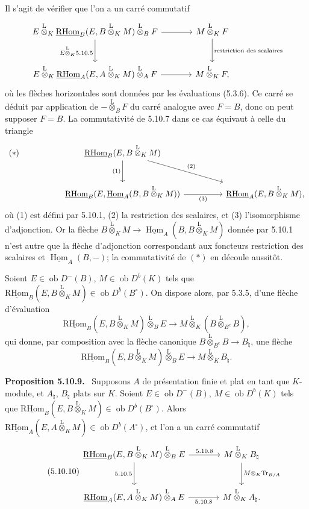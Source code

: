\documentclass[11pt]{article}
\newenvironment{statement}[1]{\par\medskip\noindent\textbf{#1.}\ }{\par\medskip}
\DeclareMathOperator{\Hom}{Hom}
\newcommand{\R}{\mathrm{R}}\newcommand{\RHomCore}{\mathrm{RHom}}
\newcommand{\ob}{\operatorname{ob}}
\providecommand{\RHom}{\RHomCore}
\providecommand{\uRHom}{\underline{\RHom}}
\providecommand{\uHom}{\underline{\Hom}}
\providecommand{\Tr}{\operatorname{Tr}}
\providecommand{\Tr}{\operatorname{Tr}}
\providecommand{\lten}{\overset{\mathrm L}{\otimes}}
\providecommand{\Tr}{\operatorname{Tr}}
\providecommand{\RHom}{\RHomCore}
\providecommand{\Hom}{\operatorname{Hom}}
\providecommand{\ob}{\operatorname{ob}}
\providecommand{\lten}{\overset{\mathrm L}{\otimes}}
\providecommand{\RHom}{\R\mathcal{H}om}
\providecommand{\lten}{\overset{\mathrm L}{\otimes}}
\providecommand{\R}{\mathrm R}
\providecommand{\Tr}{\operatorname{Tr}}
\providecommand{\lten}{\overset{\mathrm L}{\otimes}}
\providecommand{\lten}{\overset{\mathrm L}{\otimes}}
\providecommand{\lten}{\overset{\mathrm L}{\otimes}}
\providecommand{\RHom}{\RHomCore}
\providecommand{\Hom}{\operatorname{Hom}}
\providecommand{\Tr}{\operatorname{Tr}}
\providecommand{\lten}{\overset{\mathrm L}{\otimes}}
\begin{document}
Il s'agit de vérifier que l'on a un carré commutatif
\[
\begin{tikzcd}[column sep=large,row sep=large]
E\lten_K\uRHom_B(E,B\lten_KM)\lten_BF \arrow[r] \arrow[d,"E\lten_K5.10.5"'] & M\lten_KF \arrow[d,"\text{restriction des scalaires}"]\\
E\lten_K\uRHom_A(E,A\lten_KM)\lten_AF \arrow[r] & M\lten_KF,
\end{tikzcd}
\]
où les flèches horizontales sont données par les évaluations (5.3.6). Ce carré se déduit par application de $-\lten_BF$ du carré analogue avec $F=B$, donc on peut supposer $F=B$. La commutativité de 5.10.7 dans ce cas équivaut à celle du triangle
\[
\begin{tikzcd}[column sep=huge,row sep=large]
|[alias=star]| {(*)} & \uRHom_B(E,B\lten_KM) \arrow[d,"(1)"'] \arrow[dr,"(2)"] & \\
& \uRHom_B(E,\uHom_A(B,B\lten_KM)) \arrow[r,"(3)"'] & \uRHom_A(E,B\lten_KM),
\end{tikzcd}
\]
où (1) est défini par 5.10.1, (2) la restriction des scalaires, et (3) l'isomorphisme d'adjonction. Or la flèche $B\lten_KM\to\uHom_A(B,B\lten_KM)$ donnée par 5.10.1 n'est autre que la flèche d'adjonction correspondant aux foncteurs restriction des scalaires et $\uHom_A(B,-)$; la commutativité de $(*)$ en découle aussitôt.

Soient $E\in\ob D^-(B)$, $M\in\ob D^b(K)$ tels que $\uRHom_B(E,B\lten_KM)\in\ob D^b(B^\circ)$. On dispose alors, par 5.3.5, d'une flèche d'évaluation
\[
\uRHom_B(E,B\lten_KM)\lten_BE\longrightarrow M\lten_K(B\lten_{B^e}B),
\]
qui donne, par composition avec la flèche canonique $B\lten_{B^e}B\to B_\natural$, une flèche
\begin{equation}\tag{5.10.8}
\uRHom_B(E,B\lten_KM)\lten_BE\longrightarrow M\lten_KB_\natural.
\end{equation}

\begin{statement}{Proposition 5.10.9}
Supposons $A$ de présentation finie et plat en tant que $K$-module, et $A_\natural$, $B_\natural$ plats sur $K$. Soient $E\in\ob D^-(B)$, $M\in\ob D^b(K)$ tels que $\uRHom_B(E,B\lten_KM)\in\ob D^b(B^\circ)$. Alors $\uRHom_A(E,A\lten_KM)\in\ob D^b(A^\circ)$, et l'on a un carré commutatif
\begin{equation}\tag{5.10.10}
\begin{tikzcd}[column sep=large,row sep=large]
\uRHom_B(E,B\lten_KM)\lten_BE \arrow[r,"5.10.8"] \arrow[d,"5.10.5"'] & M\lten_KB_\natural \arrow[d,"M\otimes_K\Tr_{B/A}"]\\
\uRHom_A(E,A\lten_KM)\lten_AE \arrow[r,"5.10.8"'] & M\lten_KA_\natural .
\end{tikzcd}
\end{equation}
\end{statement}
\end{document}
